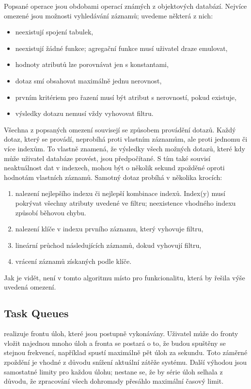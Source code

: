 Popsané operace jsou obdobami operací známých z objektových databází.
Nejvíce omezené jsou možnosti vyhledávání záznamů; uvedeme některá z nich:
\begin{itemize}
	\item neexistují spojení tabulek,
	\item neexistují žádné funkce; agregační funkce musí uživatel draze emulovat,
	\item hodnoty atributů lze porovnávat jen s konstantami,
	\item dotaz smí obsahovat maximálně jednu nerovnost,
	\item prvním kritériem pro řazení musí být atribut s nerovností, pokud existuje,
	\item výsledky dotazu nemusí vždy vyhovovat filtru.
\end{itemize}

Všechna z popsaných omezení souvisejí se způsobem provádění dotazů.
Každý dotaz, který se provádí, neprobíhá proti vlastním záznamům, ale proti jednomu či více indexům.
To vlastně znamená, že výsledky všech možných dotazů, které kdy může uživatel databáze provést, jsou předpočítané.
S tím také souvisí neaktuálnost dat v indexech, mohou být o několik sekund zpožděné oproti hodnotám vlastních záznamů.
Samotný dotaz probíhá v několika krocích:
\begin{enumerate}
	\item nalezení nejlepšího indexu či nejlepší kombinace indexů.
		Index(y) musí pokrývat všechny atributy uvedené ve filtru; neexistence vhodného indexu způsobí běhovou chybu.
	\item nalezení klíče v indexu prvního záznamu, který vyhovuje filtru,
	\item lineární průchod následujících záznamů, dokud vyhovují filtru,
	\item vrácení záznamů získaných podle klíče.
\end{enumerate}

Jak je vidět, není v tomto algoritmu místo pro funkcionalitu, která by řešila výše uvedená omezení.

\subsection{Task Queues}

 realizuje frontu úloh, které jsou postupně vykonávány.
Uživatel může do fronty vložit najednou mnoho úloh a fronta se postará o to, že budou spuštěny se stejnou frekvencí, například spustí maximálně pět úloh za sekundu.
Toto záměrné zpoždění je vhodné z důvodu snížení aktuální zátěže systému.
Další výhodou jsou samostatné limity pro každou úlohu; nestane se, že by série úloh selhala z důvodu, že zpracování všech dohromady přesáhlo maximální časový limit.

